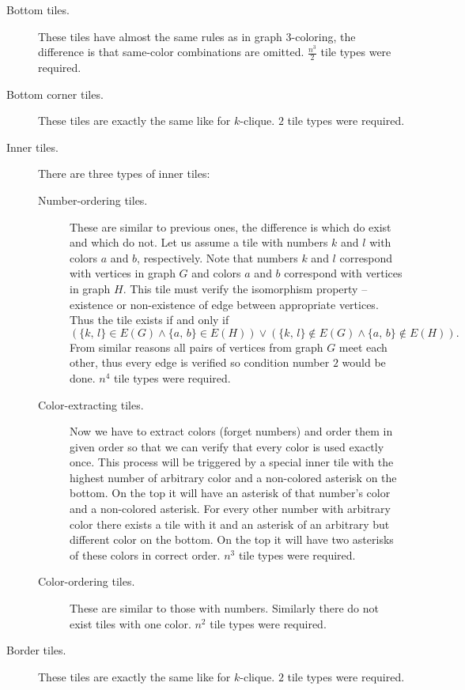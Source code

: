 \begin{description}
	\item[Bottom tiles.] These tiles have almost the same rules as in graph 3-coloring, the difference is that same-color combinations are omitted. $\frac{n^3}{2}$ tile types were required.
	\item[Bottom corner tiles.] These tiles are exactly the same like for $k$-clique. $2$ tile types were required.
	\item[Inner tiles.] There are three types of inner tiles:
	\begin{description}
		\item[Number-ordering tiles.] These are similar to previous ones, the difference is which do exist and which do not. Let us assume a tile with numbers $k$ and $l$ with colors $a$ and $b$, respectively. Note that numbers $k$ and $l$ correspond with vertices in graph $G$ and colors $a$ and $b$ correspond with vertices in graph $H$. This tile must verify the isomorphism property -- existence or non-existence of edge between appropriate vertices. Thus the tile exists if and only if
		$$(\{k,\,l\} \in E(G) \wedge \{a,\,b\} \in E(H)) \vee (\{k,\,l\} \notin E(G) \wedge \{a,\,b\} \notin E(H)) . $$
		From similar reasons all pairs of vertices from graph $G$ meet each other, thus every edge is verified so condition number $2$ would be done. $n^4$ tile types were required.
		\item[Color-extracting tiles.] Now we have to extract colors (forget numbers) and order them in given order so that we can verify that every color is used exactly once. This process will be triggered by a special inner tile with the highest number of arbitrary color and a non-colored asterisk on the bottom. On the top it will have an asterisk of that number's color and a non-colored asterisk. For every other number with arbitrary color there exists a tile with it and an asterisk of an arbitrary but different color on the bottom. On the top it will have two asterisks of these colors in correct order. $n^3$ tile types were required.
		\item[Color-ordering tiles.] These are similar to those with numbers. Similarly there do not exist tiles with one color. $n^2$ tile types were required.
	\end{description}
	\item[Border tiles.] These tiles are exactly the same like for $k$-clique. $2$ tile types were required.

\end{description}
